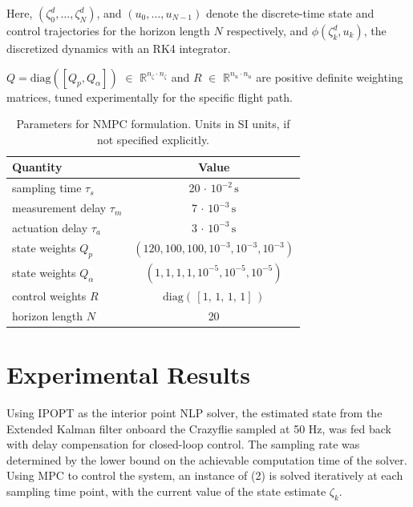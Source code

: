 \documentclass[conference]{IEEEtran}
\begin{document}
\par Here, $(\zeta^{d}_{0}, \dots, \zeta^{d}_{N})$, and $(u_0, \dots, u_{N-1})$ denote the discrete-time state and control trajectories for the horizon length $N$ respectively, and $\phi(\zeta^{d}_k, u_k)$, the discretized dynamics with an RK4 integrator.

 $Q = \mathrm{diag}([Q_{p}, Q_{\alpha}])$ $\in$ $\mathbb{R}^{n_{\zeta} \cdot n_{\zeta}}$ and $R$ $\in$ $\mathbb{R}^{n_{u} \cdot n_{u}}$ are positive definite weighting matrices, tuned experimentally for the specific flight path.

 \begin{table}[b!]
    \small
	\begin{center}
        \begin{tabular}{lc}\toprule
		    \textbf{Quantity} & \textbf{Value}\\
            \midrule
            sampling time $\tau_{s}$ & 20 $\cdot$ $10^{-2}\,\mathrm{s}$ \\
            measurement delay $\tau_{m}$ & 7 $\cdot$ $10^{-3}\,\mathrm{s}$ \\
            actuation delay $\tau_{a}$ & 3 $\cdot$ $10^{-3}\,\mathrm{s}$ \\
            state weights $Q_{p}$ & $(120, 100, 100, 10^{-3}, 10^{-3},10^{-3})$\\
			state weights $Q_{\alpha}$ & $(1, 1, 1, 1, 10^{-5}, 10^{-5}, 10^{-5})$\\
            control weights $R$ & $\mathrm{diag}(\, [1, \,1, \,1, \,1]\,)$\\
		    horizon length $N$ & 20\\
            \bottomrule
		\end{tabular}
	\end{center}
    \caption{Parameters for NMPC formulation. Units in SI units, if not specified explicitly.}
    \label{table2}
\end{table}

\section{Experimental Results }\label{Section4}
Using IPOPT \cite{wachter_implementation_2006} as the interior point NLP solver, the estimated state from the Extended Kalman filter onboard the Crazyflie sampled at 50 Hz, was fed back with delay compensation for closed-loop control. The sampling rate was determined by the lower bound on the achievable computation time of the solver. Using MPC to control the system, an instance of (2) is solved iteratively at each sampling time point, with the current value of the state estimate $\zeta_k$.
\end{document}
